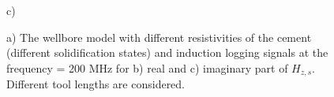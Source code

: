 \documentclass[10pt,twoside]{article}
\begin{document}
\begin{figure}[ht!]
\begin{minipage}[h]{0.34\linewidth}
 c) \\
\end{minipage}
\hfill
\caption{a) The wellbore model with different resistivities of the cement (different solidification states) and induction logging signals at the frequency = 200 MHz for b) real and c) imaginary part of $H_{z,s}$. Different tool lengths are considered.}
\label{logging_cement_solid}
\end{figure}
\end{document}
